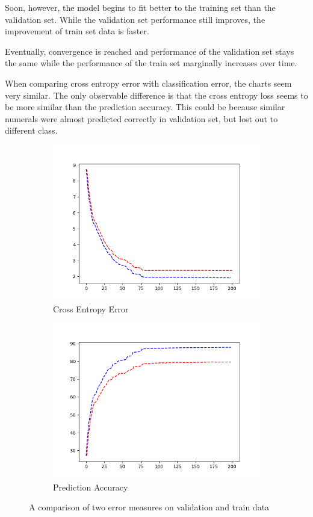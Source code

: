 \documentclass{article}
\begin{document}
Soon, however, the model begins to fit better to the training set than the validation set. While the validation set performance still improves, the improvement of train set data is faster.

Eventually, convergence is reached and performance of the validation set stays the same while the performance of the train set marginally increases over time.

When comparing cross entropy error with classification error, the charts seem very similar. The only observable difference is that the cross entropy loss seems to be more similar than the prediction accuracy. This could be because similar numerals were almost predicted correctly in validation set, but lost out to different class.


\begin{figure}
\centering
\begin{subfigure}{.5\textwidth}
  \centering
  \includegraphics[width=.8\linewidth]{q6a.png}
  \caption{Cross Entropy Error}
  \label{fig:sub1}
\end{subfigure}%
\begin{subfigure}{.5\textwidth}
  \centering
  \includegraphics[width=.8\linewidth]{q6b.png}
  \caption{Prediction Accuracy}
  \label{fig:sub2}
\end{subfigure}
\caption{A comparison of two error measures on validation and train data}
\label{fig:6a}
\end{figure}
\end{document}
